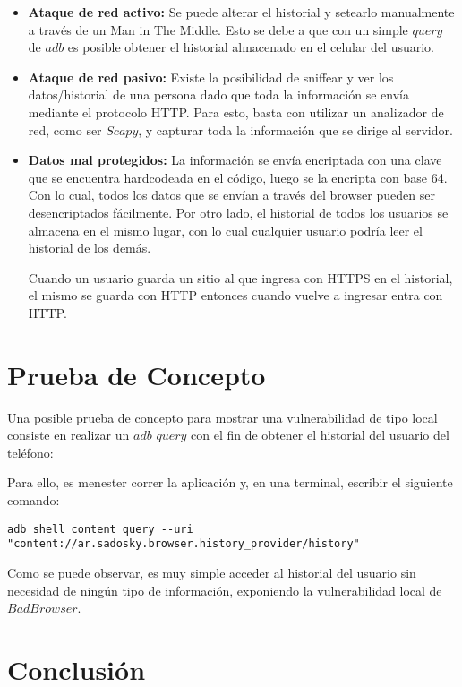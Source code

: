 \documentclass[10pt, a4paper]{article}
\begin{document}
\begin{itemize}
\item \textbf{Ataque de red activo:} Se puede alterar el historial y setearlo manualmente a través de un Man in The Middle. Esto se debe a que con un simple $query$ de $adb$ es posible obtener el historial almacenado en el celular del usuario.

\item \textbf{Ataque de red pasivo:} Existe la posibilidad de sniffear y ver los datos/historial de una persona dado que toda la información se envía mediante el protocolo HTTP. Para esto, basta con utilizar un analizador de red, como ser $Scapy$, y capturar toda la información que se dirige al servidor.

\item \textbf{Datos mal protegidos:} La información se envía encriptada con una clave que se encuentra hardcodeada en el código, luego se la encripta con base 64. Con lo cual, todos los datos que se envían a través del browser pueden ser desencriptados fácilmente. Por otro lado, el historial de todos los usuarios se almacena en el mismo lugar, con lo cual cualquier usuario podría leer el historial de los demás.

Cuando un usuario guarda un sitio al que ingresa con HTTPS en el historial, el mismo se guarda con HTTP entonces cuando vuelve a ingresar entra con HTTP.


\end{itemize}

\newpage
\section{Prueba de Concepto}

Una posible prueba de concepto para mostrar una vulnerabilidad de tipo local consiste en realizar un $adb$ $query$ con el fin de obtener el historial del usuario del teléfono:

Para ello, es menester correr la aplicación y, en una terminal, escribir el siguiente comando:

\begin{verbatim}
adb shell content query --uri "content://ar.sadosky.browser.history_provider/history"
\end{verbatim}

Como se puede observar, es muy simple acceder al historial del usuario sin necesidad de ningún tipo de información, exponiendo la vulnerabilidad local de $BadBrowser$.

\newpage
\section{Conclusión}
\end{document}
